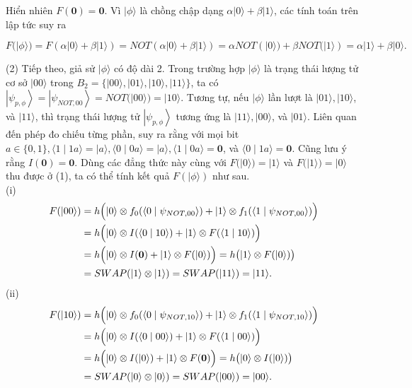\documentclass[10pt]{article}
\begin{document}
Hiển nhiên $F(\mathbf{0})=\mathbf{0}$. Vì $|\phi\rangle$ là chồng chập dạng $\alpha|0\rangle+\beta|1\rangle$, các tính toán trên lập tức suy ra

$$
F(|\phi\rangle)=F(\alpha|0\rangle+\beta|1\rangle)=N O T(\alpha|0\rangle+\beta|1\rangle)=\alpha N O T(|0\rangle)+\beta N O T(|1\rangle)=\alpha|1\rangle+\beta|0\rangle .
$$

(2) Tiếp theo, giả sử $|\phi\rangle$ có độ dài 2. Trong trường hợp $|\phi\rangle$ là trạng thái lượng tử cơ sở $|00\rangle$ trong $B_{2}=\{|00\rangle,|01\rangle,|10\rangle,|11\rangle\}$, ta có $\left|\psi_{p, \phi}\right\rangle=\left|\psi_{N O T, 00}\right\rangle=N O T(|00\rangle)=|10\rangle$. Tương tự, nếu $|\phi\rangle$ lần lượt là $|01\rangle,|10\rangle$, và $|11\rangle$, thì trạng thái lượng tử $\left|\psi_{p, \phi}\right\rangle$ tương ứng là $|11\rangle,|00\rangle$, và $|01\rangle$. Liên quan đến phép đo chiếu từng phần, suy ra rằng với mọi bit $a \in\{0,1\},\langle 1 \mid 1 a\rangle=|a\rangle,\langle 0 \mid 0 a\rangle=|a\rangle,\langle 1 \mid 0 a\rangle=\mathbf{0}$, và $\langle 0 \mid 1 a\rangle=\mathbf{0}$. Cũng lưu ý rằng $I(\mathbf{0})=\mathbf{0}$. Dùng các đẳng thức này cùng với $F(|0\rangle)=|1\rangle$ và $F(|1\rangle)=|0\rangle$ thu được ở (1), ta có thể tính kết quả $F(|\phi\rangle)$ như sau.\\
(i)
\[
\begin{aligned}
F(|00\rangle)
&= h\Bigl(|0\rangle \otimes f_{0}(\langle 0 \mid \psi_{N O T, 00}\rangle)
  + |1\rangle \otimes f_{1}(\langle 1 \mid \psi_{N O T, 00}\rangle)\Bigr) \\
&= h\Bigl(|0\rangle \otimes I(\langle 0 \mid 10\rangle)
  + |1\rangle \otimes F(\langle 1 \mid 10\rangle)\Bigr) \\
&= h\Bigl(|0\rangle \otimes I(\mathbf{0}) + |1\rangle \otimes F(|0\rangle)\Bigr)
 = h\bigl(|1\rangle \otimes F(|0\rangle)\bigr) \\
&= S W A P(|1\rangle \otimes |1\rangle)=S W A P(|11\rangle)=|11\rangle.
\end{aligned}
\]
(ii)
\[
\begin{aligned}
F(|10\rangle)
&= h\Bigl(|0\rangle \otimes f_{0}(\langle 0 \mid \psi_{N O T, 10}\rangle)
  + |1\rangle \otimes f_{1}(\langle 1 \mid \psi_{N O T, 10}\rangle)\Bigr) \\
&= h\Bigl(|0\rangle \otimes I(\langle 0 \mid 00\rangle)
  + |1\rangle \otimes F(\langle 1 \mid 00\rangle)\Bigr) \\
&= h\Bigl(|0\rangle \otimes I(|0\rangle) + |1\rangle \otimes F(\mathbf{0})\Bigr)
 = h\bigl(|0\rangle \otimes I(|0\rangle)\bigr) \\
&= S W A P(|0\rangle \otimes |0\rangle)=S W A P(|00\rangle)=|00\rangle.
\end{aligned}
\]
\end{document}
